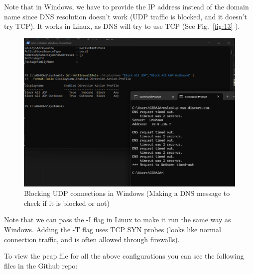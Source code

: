 \documentclass{article}
\begin{document}
Note that in Windows, we have to provide the IP address instead of the domain name since DNS resolution doesn't work (UDP traffic is blocked, and it doesn't try TCP).
It works in Linux, as DNS will try to use TCP (See Fig.~\ref{fig:13} ).

\begin{figure}[H]
    \centering
    \includegraphics[width=1\linewidth]{block udp connections windows.png}
    \caption{Blocking UDP connections in Windows (Making a DNS message to check if it is blocked or not)}
    \label{fig:placeholder}
\end{figure}

Note that we can pass the -I flag in Linux to make it run the same way as Windows. Adding the -T flag uses TCP SYN probes (looks like normal connection traffic, and is often allowed through firewalls). 

To view the pcap file for all the above configurations you can see the following files in the Github repo:
\end{document}
